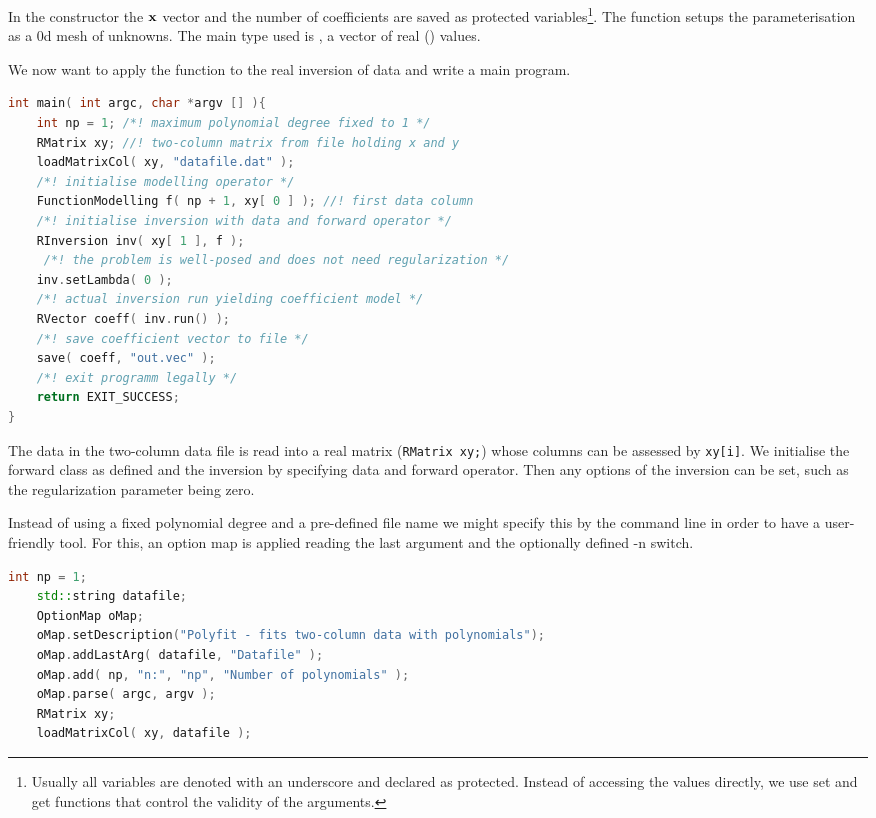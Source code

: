 In the constructor the $\mathbf{x}$ vector and the number of coefficients are saved as protected variables\footnote{Usually all variables are denoted with an underscore and declared as protected. Instead of accessing the values directly, we use set and get functions that control the validity of the arguments.}.
The function  setups the parameterisation as a 0d mesh of  unknowns.
The main type used is , a vector of real () values.

We now want to apply the function to the real inversion of data and write a main program.
\begin{lstlisting}[language=C++,morekeywords={RVector,RMatrix,RInversion,EXIT_SUCCESS}]
int main( int argc, char *argv [] ){
    int np = 1; /*! maximum polynomial degree fixed to 1 */
    RMatrix xy; //! two-column matrix from file holding x and y
    loadMatrixCol( xy, "datafile.dat" );
    /*! initialise modelling operator */
    FunctionModelling f( np + 1, xy[ 0 ] ); //! first data column
    /*! initialise inversion with data and forward operator */
    RInversion inv( xy[ 1 ], f );
     /*! the problem is well-posed and does not need regularization */
    inv.setLambda( 0 );
    /*! actual inversion run yielding coefficient model */
    RVector coeff( inv.run() );
    /*! save coefficient vector to file */
    save( coeff, "out.vec" );
    /*! exit programm legally */
    return EXIT_SUCCESS;
}
\end{lstlisting}

The data in the two-column data file is read into a real matrix (\lstinline|RMatrix xy;|) whose columns can be assessed by \lstinline|xy[i]|. We initialise the forward class as defined and the inversion by specifying data and forward operator.
Then any options of the inversion can be set, such as the regularization parameter being zero.

Instead of using a fixed polynomial degree and a pre-defined file name we might specify this by the command line in order to have a user-friendly tool.
For this, an option map is applied reading the last argument and the optionally defined -n switch.
\begin{lstlisting}[language=C++,morekeywords={OptionMap,RMatrix,loadMatrixCol}]
    int np = 1;
    std::string datafile;
    OptionMap oMap;
    oMap.setDescription("Polyfit - fits two-column data with polynomials");
    oMap.addLastArg( datafile, "Datafile" );
    oMap.add( np, "n:", "np", "Number of polynomials" );
    oMap.parse( argc, argv );
    RMatrix xy; 
    loadMatrixCol( xy, datafile );
\end{lstlisting}

